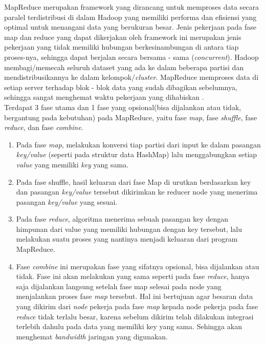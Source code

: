 		MapReduce merupakan framework yang dirancang untuk memproses data secara paralel terdistribusi di dalam Hadoop yang memiliki performa dan efisiensi yang optimal untuk menangani data yang berukuran besar. Jenis pekerjaan pada fase map dan reduce yang dapat dikerjakan oleh framework ini merupakan jenis pekerjaan yang tidak memiliki hubungan berkesinambungan di antara  tiap proses-nya, sehingga dapat berjalan secara bersama - sama (\textit{concurrent}). Hadoop membagi/memecah seluruh dataset yang ada ke dalam beberapa partisi dan mendistribusikannya ke dalam kelompok/\textit{cluster}. MapReduce memproses data di setiap server terhadap blok - blok data yang sudah dibagikan sebelumnya, sehingga sangat menghemat waktu pekerjaan yang dihabiskan \cite{Lam:2010:HA:1965594}. \\
		Terdapat 3 fase utama dan 1 fase yang opsional(bisa dijalankan atau tidak, bergantung pada kebutuhan) pada MapReduce, yaitu fase \textit{map}, fase \textit{shuffle}, fase \textit{reduce}, dan fase \textit{combine}. 
		\begin{enumerate}
			\item Pada fase \textit{map}, melakukan konversi tiap partisi dari input ke dalam pasangan \textit{key/value} (seperti pada struktur data HashMap) lalu menggabungkan setiap \textit{value} yang memiliki \textit{key} yang sama.
			\item Pada fase shuffle, hasil keluaran dari fase Map di urutkan berdasarkan key dan pasangan \textit{key/value} tersebut dikirimkan ke reducer node yang menerima pasangan \textit{key/value} yang sesuai.
			\item Pada fase \textit{reduce}, algoritma menerima sebuah pasangan key dengan himpunan dari value yang memiliki hubungan dengan key tersebut, lalu melakukan suatu proses yang nantinya menjadi keluaran dari program MapReduce.
			\item Fase \textit{combine} ini merupakan fase yang sifatnya opsional, bisa dijalankan atau tidak. Fase ini akan melakukan yang sama seperti pada fase \textit{reduce}, hanya saja dijalankan langsung setelah fase map selesai pada node yang menjalankan proses fase \textit{map} tersebut. Hal ini bertujuan agar besaran data yang dikirim dari \textit{node} pekerja pada fase \textit{map} kepada node pekerja pada fase \textit{reduce} tidak terlalu besar, karena sebelum dikirim telah dilakukan integrasi terlebih dahulu pada data yang memiliki key yang sama. Sehingga akan menghemat \textit{bandwidth} jaringan yang digunakan.
		\end{enumerate} 
		
